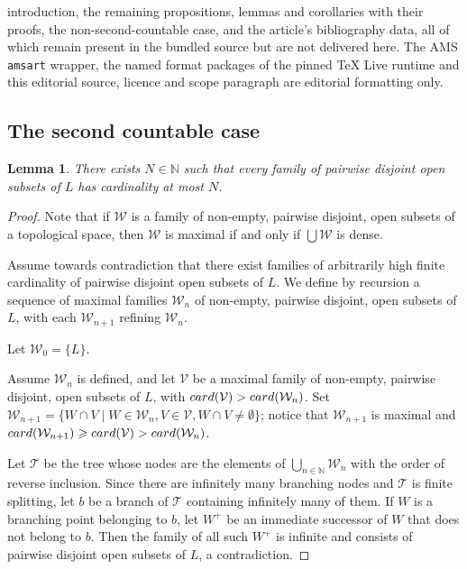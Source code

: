 \documentclass[10pt,a4paper]{amsart}
\newtheorem{lem}[thm]{Lemma}
\newcommand{\N}{\mathbb N}
\newcommand{\card}{{\rm{card}}}
\begin{document}
introduction, the remaining propositions, lemmas and corollaries with their proofs, the non-second-countable case, and the article's bibliography data, all of which remain present in the bundled source but are not delivered here. The AMS \texttt{amsart} wrapper, the named format packages of the pinned TeX Live runtime and this editorial source, licence and scope paragraph are editorial formatting only.\par\smallskip
\setcounter{section}{3}
\setcounter{equation}{0}
\setcounter{thm}{0}
\subsection{The second countable case} \label{sec:sccnt}

\setcounter{section}{3}
\setcounter{equation}{1}
\setcounter{thm}{11}
\begin{lem}
There exists $N\in \N $ such that every family of pairwise disjoint open subsets of $L$ has cardinality at most $N$.
\end{lem}

\setcounter{section}{3}
\setcounter{equation}{1}
\setcounter{thm}{12}
\begin{proof}
Note that if $ \mathcal W $ is a family of non-empty, pairwise disjoint, open subsets of a topological space, then $ \mathcal W $ is maximal if and only if $\bigcup \mathcal W $ is dense.

Assume towards contradiction that there exist families of arbitrarily high finite cardinality of pairwise disjoint open subsets of $L$.
We define by recursion a sequence of maximal families $ \mathcal W_n$ of non-empty, pairwise disjoint, open subsets of $L$, with each $ \mathcal W_{n+1}$ refining $ \mathcal W_n$.

Let $ \mathcal W_0=\{ L\} $.

Assume $ \mathcal W_n$ is defined, and let $ \mathcal V $ be a maximal family of non-empty, pairwise disjoint, open subsets of $L$, with $ \card ( \mathcal V)> \card ( \mathcal W_n)$.
Set $ \mathcal W_{n+1}=\{ W\cap V\mid W\in \mathcal W_n,V\in \mathcal V ,W\cap V\ne\emptyset\} $; notice that $ \mathcal W_{n+1}$ is maximal and $ \card ( \mathcal W_{n+1})\geqslant \card ( \mathcal V )> \card ( \mathcal W_n)$.

Let $ \mathcal T $ be the tree whose nodes are the elements of $\bigcup_{n\in \N } \mathcal W_n$ with the order of reverse inclusion.
Since there are infinitely many branching nodes and $ \mathcal T $ is finite splitting, let $b$ be a branch of $ \mathcal T $ containing infinitely many of them.
If $W$ is a branching point belonging to $b$, let $W^+$ be an immediate successor of $W$ that does not belong to $b$.
Then the family of all such $W^+$ is infinite and consists of pairwise disjoint open subsets of $L$, a contradiction.
\end{proof}
\end{document}
